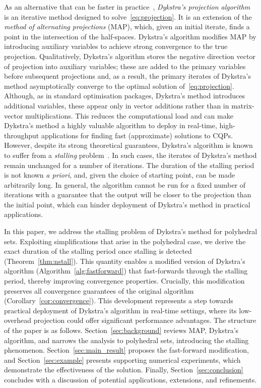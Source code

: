 As an alternative that can be faster in practice~\cite{KEMPF20206542}, \textit{Dykstra's projection algorithm}~\cite{DYKSTRA} is an iterative method designed to solve~\eqref{eq:projection}. It is an extension of the \textit{method of alternating projections} (MAP), which, given an initial iterate, finds a point in the intersection of the half-spaces. Dykstra's algorithm modifies MAP by introducing auxiliary variables to achieve strong convergence to the true projection. Qualitatively, Dykstra's algorithm stores the negative direction vector of projection into auxiliary variables; these are added to the primary variables before subsequent projections and, as a result, the primary iterates of Dykstra's method asymptotically converge to the optimal solution of~\eqref{eq:projection}. Although, as in standard optimisation packages, Dykstra's method introduces additional variables, these appear only in vector additions rather than in matrix-vector multiplications. This reduces the computational load and can make Dykstra's method a highly valuable algorithm to deploy in real-time, high-throughput applications for finding fast (approximate) solutions to CQPs. However, despite its strong theoretical guarantees, Dykstra's algorithm is known to suffer from a \emph{stalling} problem~\cite{DYKSTRASTALLING}. In such cases, the iterates of Dykstra's method remain unchanged for a number of iterations. The duration of the stalling period is not known \emph{a priori}, and, given the choice of starting point, can be made arbitrarily long. In general, the algorithm cannot be run for a fixed number of iterations with a guarantee that the output will be closer to the projection than the initial point, which can hinder deployment of Dykstra's method in practical applications.

In this paper, we address the stalling problem of Dykstra's method for polyhedral sets. Exploiting simplifications that arise in the polyhedral case, we derive the exact duration of the stalling period once stalling is detected (Theorem~\ref{thm:nstall}). This quantity enables a modified version of Dykstra's algorithm (Algorithm~\ref{alg:fastforward}) that fast-forwards through the stalling period, thereby improving convergence properties. Crucially, this modification preserves all convergence guarantees of the original algorithm (Corollary~\ref{cor:convergence}). This development represents a step towards practical deployment of Dykstra's algorithm in real-time settings, where its low-overhead projection could offer significant performance advantages. The structure of the paper is as follows. Section~\ref{sec:background} reviews MAP, Dykstra's algorithm, and narrows the analysis to polyhedral sets, introducing the stalling phenomenon. Section~\ref{sec:main_result} proposes the fast-forward modification, and Section~\ref{sec:example} presents supporting numerical experiments, which demonstrate the effectiveness of the solution. Finally, Section~\ref{sec:conclusion} concludes with a discussion of potential applications, extensions, and refinements. 


